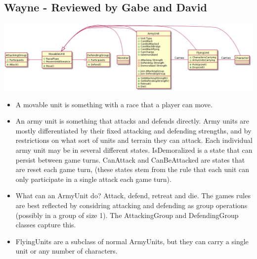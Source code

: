 \documentclass[12pt,a4paper]{article}
\begin{document}
\subsection{Wayne - Reviewed by Gabe and David}
\includegraphics[width=\textwidth]{UnitDiagrams.png}
\begin{itemize}

\item A movable unit is something with a race that a player can move.

\item An army unit is something that attacks and defends directly. Army
units are mostly differentiated by their fixed attacking and defending
strengths, and by restrictions on what sort of units and terrain they
can attack. Each individual army unit may be in several different
states. IsDemoralized is a state that can persist between game turns.
CanAttack and CanBeAttacked are states that are reset each game turn,
(these states stem from the rule that each unit can only participate
in a single attack each game turn).

\item What can an ArmyUnit do? Attack, defend, retreat and die. The games
rules are best reflected by considring attacking and defending as
group operations (possibly in a group of size 1). The AttackingGroup
and DefendingGroup classes capture this.

\item FlyingUnits are a subclass of normal ArmyUnits, but they can carry a
single unit or any number of characters.
\end{itemize}
\end{document}
